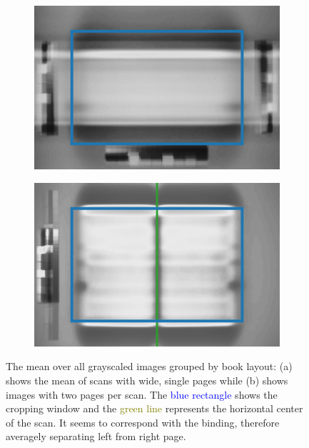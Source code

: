 \documentclass{ltjarticle}
\begin{document}
\begin{figure}
    \centering
    \begin{subfigure}{.49\textwidth}
        \includegraphics[width=\textwidth]{landscape-average.jpg}
        \caption{}
    \end{subfigure}
    \begin{subfigure}{.49\textwidth}
        \includegraphics[width=\textwidth]{portrait-average.jpg}
        \caption{}
    \end{subfigure}
    \caption[Mean over all images by layout]{The mean over all grayscaled images grouped by book layout: (a) shows the mean of scans with wide, single pages while (b) shows images with two pages per scan. The \textcolor{blue}{blue rectangle} shows the cropping window and the \textcolor{olive}{green line} represents the horizontal center of the scan. It seems to correspond with the binding, therefore averagely separating left from right page.}
    \label{fig:average}
\end{figure}
\end{document}
